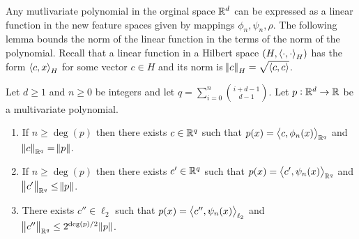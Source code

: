 Any mutlivariate polynomial in the orginal space $\mathbb{R}^d$ can be expressed as a
linear function in the new feature spaces given by mappings $\phi_n, \psi_n,
\rho$. The following lemma bounds the norm of the linear function in the terms
of the norm of the polynomial. Recall that a linear function in a Hilbert space
$(H, \left\langle \cdot, \cdot \right\rangle_H)$ has the form $\left\langle c, x \right\rangle_H$ for some vector $c \in H$
and its norm is $\norm{c}_H = \sqrt{\left\langle c, c \right\rangle}$.

\begin{lemma}
\label{lemma:norm-bound}
Let $d \ge 1$ and $n \ge 0$ be integers and let $q = \sum_{i=0}^n \binom{i+d-1}{d-1}$.
Let $p:\mathbb{R}^d \to \mathbb{R}$ be a multivariate polynomial.
\begin{enumerate}
\item If $n \ge \deg(p)$ then there exists $c \in \mathbb{R}^q$ such that $p(x) = \left\langle c, \phi_n(x) \right\rangle_{\mathbb{R}^q}$
and $\norm{c}_{\mathbb{R}^q} = \norm{p}$.
\item If $n \ge \deg(p)$ then there exists $c' \in \mathbb{R}^q$ such that $p(x) = \left\langle c', \psi_n(x) \right\rangle_{\mathbb{R}^q}$
and $\norm{c'}_{\mathbb{R}^q} \le \norm{p}$.
\item There exists $c'' \in \ell_2$ such that $p(x) = \left\langle c'', \psi_n(x) \right\rangle_{\ell_2}$
and $\norm{c''}_{\mathbb{R}^q} \le 2^{\deg(p)/2} \norm{p}$.
\end{enumerate}
\end{lemma}

